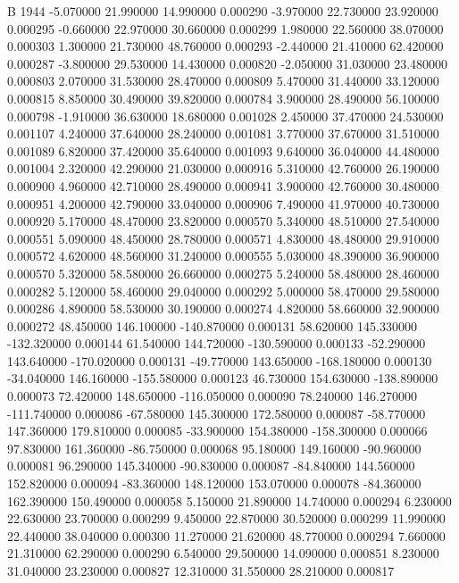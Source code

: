   
  
  
B    1944 
-5.070000 21.990000 14.990000 0.000290 
-3.970000 22.730000 23.920000 0.000295 
-0.660000 22.970000 30.660000 0.000299 
1.980000 22.560000 38.070000 0.000303 
1.300000 21.730000 48.760000 0.000293 
-2.440000 21.410000 62.420000 0.000287 
-3.800000 29.530000 14.430000 0.000820 
-2.050000 31.030000 23.480000 0.000803 
2.070000 31.530000 28.470000 0.000809 
5.470000 31.440000 33.120000 0.000815 
8.850000 30.490000 39.820000 0.000784 
3.900000 28.490000 56.100000 0.000798 
-1.910000 36.630000 18.680000 0.001028 
2.450000 37.470000 24.530000 0.001107 
4.240000 37.640000 28.240000 0.001081 
3.770000 37.670000 31.510000 0.001089 
6.820000 37.420000 35.640000 0.001093 
9.640000 36.040000 44.480000 0.001004 
2.320000 42.290000 21.030000 0.000916 
5.310000 42.760000 26.190000 0.000900 
4.960000 42.710000 28.490000 0.000941 
3.900000 42.760000 30.480000 0.000951 
4.200000 42.790000 33.040000 0.000906 
7.490000 41.970000 40.730000 0.000920 
5.170000 48.470000 23.820000 0.000570 
5.340000 48.510000 27.540000 0.000551 
5.090000 48.450000 28.780000 0.000571 
4.830000 48.480000 29.910000 0.000572 
4.620000 48.560000 31.240000 0.000555 
5.030000 48.390000 36.900000 0.000570 
5.320000 58.580000 26.660000 0.000275 
5.240000 58.480000 28.460000 0.000282 
5.120000 58.460000 29.040000 0.000292 
5.000000 58.470000 29.580000 0.000286 
4.890000 58.530000 30.190000 0.000274 
4.820000 58.660000 32.900000 0.000272 
48.450000 146.100000 -140.870000 0.000131 
58.620000 145.330000 -132.320000 0.000144 
61.540000 144.720000 -130.590000 0.000133 
-52.290000 143.640000 -170.020000 0.000131 
-49.770000 143.650000 -168.180000 0.000130 
-34.040000 146.160000 -155.580000 0.000123 
46.730000 154.630000 -138.890000 0.000073 
72.420000 148.650000 -116.050000 0.000090 
78.240000 146.270000 -111.740000 0.000086 
-67.580000 145.300000 172.580000 0.000087 
-58.770000 147.360000 179.810000 0.000085 
-33.900000 154.380000 -158.300000 0.000066 
97.830000 161.360000 -86.750000 0.000068 
95.180000 149.160000 -90.960000 0.000081 
96.290000 145.340000 -90.830000 0.000087 
-84.840000 144.560000 152.820000 0.000094 
-83.360000 148.120000 153.070000 0.000078 
-84.360000 162.390000 150.490000 0.000058 
5.150000 21.890000 14.740000 0.000294 
6.230000 22.630000 23.700000 0.000299 
9.450000 22.870000 30.520000 0.000299 
11.990000 22.440000 38.040000 0.000300 
11.270000 21.620000 48.770000 0.000294 
7.660000 21.310000 62.290000 0.000290 
6.540000 29.500000 14.090000 0.000851 
8.230000 31.040000 23.230000 0.000827 
12.310000 31.550000 28.210000 0.000817 
